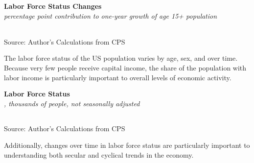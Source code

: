 \documentclass{report}
\makeatletter
\newcommand{\tbllink}[1]{\href{https://raw.githubusercontent.com/bdecon/US-chartbook/master/chartbook/data/#1}{\faTable}}
\newcommand*\short[1]{\expandafter\@gobbletwo\number\numexpr#1\relax}
\newcommand{\ctsbar}[5]{
		\addplot[ybar stacked, bar width=#5, draw opacity=0, fill=#1] 
			table [x=#2, y=#3, col sep=comma]{#4};}
\newcommand{\dateaxisticks}{
		date coordinates in=x, axis line style={draw=none},
		xmax={2022-01-30},
		max space between ticks=40,	    
		xtick={{1990-01-01}, {1992-01-01}, {1994-01-01}, 
			{1996-01-01}, {1998-01-01}, {2000-01-01}, 
			{2002-01-01}, {2004-01-01}, {2006-01-01},
			{2008-01-01}, {2010-01-01}, {2012-01-01}, {2014-01-01},
		    {2016-01-01}, {2018-01-01}, {2020-01-01}, {2022-01-01}},
		minor xtick={{1989-01-01}, {1991-01-01}, {1993-01-01},
			{1995-01-01}, {1997-01-01}, {1999-01-01}, 
			{2001-01-01}, {2003-01-01}, {2005-01-01}, {2007-01-01},
		    {2009-01-01}, {2011-01-01}, {2013-01-01}, {2015-01-01},
		    {2017-01-01}, {2019-01-01}, {2021-01-01}},
		enlarge y limits={0.06}, enlarge x limits={0.01},
		}
\newcommand{\bbar}[2]{extra #1 ticks = {{#2}}, extra #1 tick labels = ,
		extra #1 tick style = {grid=major, grid style={thick, black!25}},}
\newcommand{\rbars}{
		\fill[color=black!10] (axis cs:{1990-07-01},\pgfkeysvalueof{/pgfplots/ymin}) rectangle 
			(axis cs:{1991-03-01}, \pgfkeysvalueof{/pgfplots/ymax});
		\fill[color=black!10] (axis cs:{2007-12-01},\pgfkeysvalueof{/pgfplots/ymin}) rectangle 
			(axis cs:{2009-07-01}, \pgfkeysvalueof{/pgfplots/ymax});
		\fill[color=black!10] (axis cs:{2001-03-01},\pgfkeysvalueof{/pgfplots/ymin}) rectangle 
			(axis cs:{2001-11-01}, \pgfkeysvalueof{/pgfplots/ymax});
		\fill[color=black!10] (axis cs:{2020-02-01},\pgfkeysvalueof{/pgfplots/ymin}) rectangle 
			(axis cs:{2020-05-01}, \pgfkeysvalueof{/pgfplots/ymax});}
\makeatother
\begin{document}
{\begin{minipage}{0.76\textwidth}
\normalsize \textbf{Labor Force Status Changes}\\
\footnotesize{\textit{percentage point contribution to one-year growth of age 15+ population}}\\
\hspace*{-2mm} \\
\footnotesize{Source: Author's Calculations from CPS} \hfill \tbllink{cps_lfs2.csv}
\end{minipage}
\newpage
\begin{minipage}{0.76\textwidth}
\small The labor force status of the US population varies by age, sex, and over time. Because very few people receive capital income, the share of the population with labor income is particularly important to overall levels of economic activity. 
\vspace{2mm}

\normalsize \textbf{Labor Force Status}\\
\footnotesize{\textit{\unskip, thousands of people, not seasonally adjusted}}\\
\noindent {} \setlength{\tabcolsep}{3.0pt} \color{black!90}
		{\renewcommand{\arraystretch}{1.52}
		 \begin{tabular}{p{27.8mm} R{11.2mm} R{10.4mm} R{10.4mm} R{10.2mm} 
		 				 R{10.6mm} R{10.4mm} R{10.4mm}}
			  \hline
		\end{tabular}}
\vspace{-2mm}	
	
\footnotesize{Source: Author's Calculations from CPS}
\vspace{4mm}

\small Additionally, changes over time in labor force status are particularly important to understanding both secular and cyclical trends in the economy. 
\vspace{2mm}


\end{minipage}}
\end{document}
